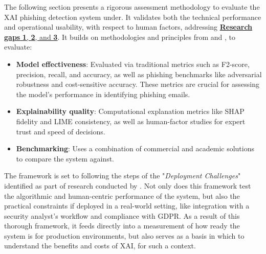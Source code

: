 
The following section presents a rigorous assessment methodology to evaluate the XAI phishing detection system under. It validates both the technical performance and operational usability, with respect to human factors, addressing \uline{\textbf{Research gaps} \hyperref[research-gap-1]{\uline{\textbf{1}}}, \hyperref[research-gap-2]{\textbf{2}}, and \hyperref[research-gap-3]{\textbf{3}}}. It builds on methodologies and principles from \cite{reddy2023explainable} and \cite{van2024applicability}, to evaluate:

\begin{itemize}
  \item \textbf{Model effectiveness}: Evaluated via traditional metrics such as F2-score, precision, recall, and accuracy, as well as phishing benchmarks like adversarial robustness and cost-sensitive accuracy. These metrics are crucial for assessing the model's performance in identifying phishing emails.
  \item \textbf{Explainability quality}: Computational explanation metrics like SHAP fidelity and LIME consistency, as well as human-factor studies for expert trust and speed of decisions.
  \item \textbf{Benchmarking}: Uses a combination of commercial and academic solutions to compare the system against.
\end{itemize}

\noindent The framework is set to following the steps of the "\textit{Deployment Challenges}" identified as part of research conducted by \citep{atlam2022business}. Not only does this framework test the algorithmic and human-centric performance of the system, but also the practical constraints if deployed in a real-world setting, like integration with a security analyst's workflow and compliance with GDPR. As a result of this thorough framework, it feeds directly into a measurement of how ready the system is for production environments, but also serves as a basis in which to understand the benefits and costs of XAI, for such a context.
